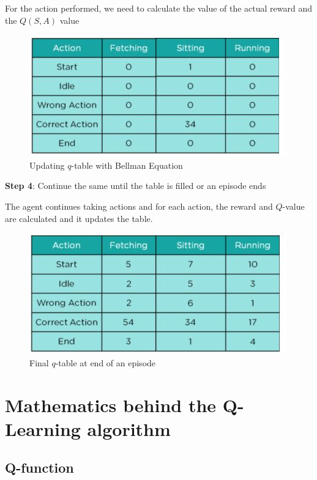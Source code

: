 For the action performed, we need to calculate the value of the actual reward and 
the $Q( S, A )$ value

\begin{figure}[h]
\centering
\includegraphics[scale=0.618]{pix/q_learning/9-updatingq.jpg}
\caption{Updating $q$-table with Bellman Equation}
\end{figure}

{\bf Step 4}: Continue the same until the table is filled or an episode ends

The agent continues taking actions and for each action, the reward and $Q$-value are 
calculated and it updates the table.

\begin{figure}[h]
\centering
\includegraphics[scale=0.618]{pix/q_learning/10-finalq.jpg}
\caption{Final $q$-table at end of an episode}
\end{figure}


%
\section{Mathematics behind the Q-Learning algorithm}
%

\subsection{Q-function}

